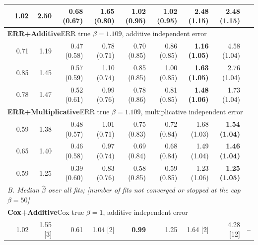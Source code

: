 \documentclass[10pt]{article}
\begin{document}
\begin{table}[ht]
\begin{threeparttable}
\begin{tabular}{l rrrrrrrr r}
\quad 0.9 & 1.02 & 2.50 & 0.68 {\color{gray}(0.67)} & 1.65 {\color{gray}(0.80)} & 1.02 {\color{gray}(0.95)} & \boldmath\textbf{1.02 {\color{gray}(0.95)}} & 2.48 {\color{gray}(1.15)} & 2.48 {\color{gray}(1.15)} &  \\
\midrule
\multicolumn{10}{l}{\textbf{ERR+Additive}\quad ERR true $\beta = 1.109$, additive independent error} \\
\quad 0.3 & 0.71 & 1.19 & 0.47 {\color{gray}(0.58)} & 0.78 {\color{gray}(0.71)} & 0.70 {\color{gray}(0.85)} & 0.86 {\color{gray}(0.85)} & \boldmath\textbf{1.16 {\color{gray}(1.05)}} & 4.58 {\color{gray}(1.04)} &  \\
\quad 0.6 & 0.85 & 1.45 & 0.57 {\color{gray}(0.59)} & 1.10 {\color{gray}(0.74)} & 0.85 {\color{gray}(0.85)} & 1.00 {\color{gray}(0.85)} & \boldmath\textbf{1.63 {\color{gray}(1.05)}} & 2.76 {\color{gray}(1.04)} &  \\
\quad 0.9 & 0.78 & 1.47 & 0.52 {\color{gray}(0.61)} & 0.99 {\color{gray}(0.76)} & 0.78 {\color{gray}(0.86)} & 0.81 {\color{gray}(0.85)} & \boldmath\textbf{1.48 {\color{gray}(1.06)}} & 1.73 {\color{gray}(1.04)} &  \\
\midrule
\multicolumn{10}{l}{\textbf{ERR+Multiplicative}\quad ERR true $\beta = 1.109$, multiplicative independent error} \\
\quad 0.3 & 0.59 & 1.38 & 0.48 {\color{gray}(0.57)} & 1.01 {\color{gray}(0.71)} & 0.75 {\color{gray}(0.83)} & 0.72 {\color{gray}(0.84)} & 1.68 {\color{gray}(1.03)} & \boldmath\textbf{1.54 {\color{gray}(1.04)}} &  \\
\quad 0.6 & 0.65 & 1.40 & 0.46 {\color{gray}(0.58)} & 0.97 {\color{gray}(0.74)} & 0.69 {\color{gray}(0.84)} & 0.68 {\color{gray}(0.84)} & 1.49 {\color{gray}(1.04)} & \boldmath\textbf{1.46 {\color{gray}(1.04)}} &  \\
\quad 0.9 & 0.59 & 1.25 & 0.39 {\color{gray}(0.60)} & 0.83 {\color{gray}(0.76)} & 0.58 {\color{gray}(0.85)} & 0.59 {\color{gray}(0.85)} & 1.23 {\color{gray}(1.06)} & \boldmath\textbf{1.25 {\color{gray}(1.05)}} &  \\
\midrule[\heavyrulewidth]
\multicolumn{10}{l}{\textit{B. Median $\hat\beta$ over all fits; [number of fits not converged or stopped at the cap $\beta = 50$]}} \\[2pt]
\multicolumn{10}{l}{\textbf{Cox+Additive}\quad Cox true $\beta =     1$, additive independent error} \\
\quad 0.3 & 1.02 & 1.55 [3] & 0.61 & 1.04 [2] & \boldmath\textbf{0.99} & 1.25 & 1.64 [2] & 4.28 [12] & -- \\

\end{tabular}
\end{threeparttable}
\end{table}
\end{document}
